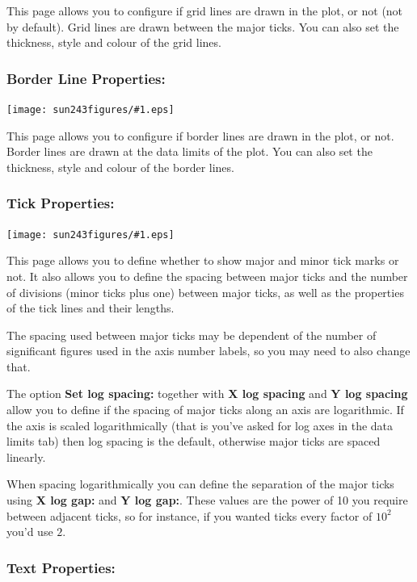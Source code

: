 \documentclass[twoside,11pt]{article}
\newcommand{\htmladdimg}[1]{}
\newcommand{\latexhtml}[2]{#1}
\renewcommand{\_}{\texttt{\symbol{95}}}
\newcommand{\mainfigure}[1]
{\begin{center}
 \latexhtml{\texttt{[image: sun243\_figures/\#1.eps]}}{\htmladdimg{#1.gif}}
 \end{center}
}
\newcommand{\labelitem}[1]{\textbf{#1}}
\begin{document}
This page allows you to configure if grid lines are drawn in the plot,
or not (not by default). Grid lines are drawn between the major
ticks. You can also set the thickness, style and colour of the grid lines.

\newpage
\subsubsection*{Border Line Properties:}

\mainfigure{configurewindowborder}

This page allows you to configure if border lines are drawn in the plot,
or not. Border lines are drawn at the data limits of the plot. You can
also set the thickness, style and colour of the border lines.

\newpage
\subsubsection*{Tick Properties:}

\mainfigure{configurewindowticks}

This page allows you to define whether to show major and minor tick
marks or not. It also allows you to define the spacing between major
ticks and the number of divisions (minor ticks plus one) between major
ticks, as well as the properties of the tick lines and their lengths.

The spacing used between major ticks may be dependent of the number of
significant figures used in the axis number labels, so you may need to
also change that.

The option \labelitem{Set log spacing:} together with
\labelitem{X log spacing} and \labelitem{Y log spacing} allow you to define if
the spacing of major ticks along an axis are logarithmic. If the axis is
scaled logarithmically (that is you've asked for log axes in the data limits
tab) then log spacing is the default, otherwise major ticks are spaced
linearly.

When spacing logarithmically you can define the separation of the major ticks
using \labelitem{X log gap:} and \labelitem{Y log gap:}. These values are
the power of 10 you require between adjacent ticks, so for instance, if you
wanted ticks every factor of $10^2$ you'd use $2$.

\newpage
\subsubsection*{Text Properties:}
\end{document}
